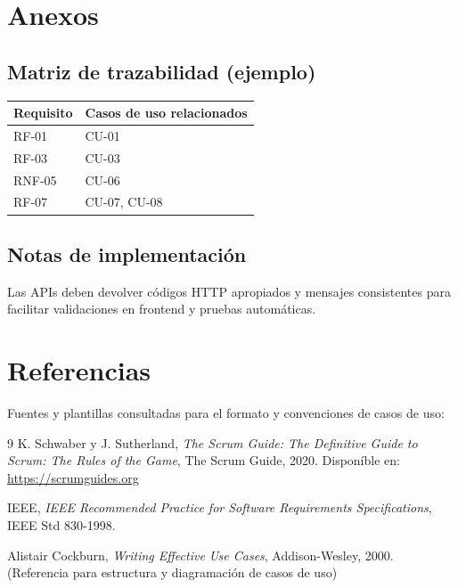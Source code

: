 \documentclass[12pt,a4paper]{article}
\begin{document}
\newpage
\section{Anexos}
\subsection*{Matriz de trazabilidad (ejemplo)}
\begin{tabularx}{\textwidth}{l X}
\toprule
Requisito & Casos de uso relacionados \\
\midrule
RF-01 & CU-01 \\
RF-03 & CU-03 \\
RNF-05 & CU-06 \\
RF-07 & CU-07, CU-08 \\
\bottomrule
\end{tabularx}

\subsection*{Notas de implementaci\'on}
Las APIs deben devolver c\'odigos HTTP apropiados y mensajes consistentes para facilitar validaciones en frontend y pruebas autom\'aticas.

\newpage
\section{Referencias}
Fuentes y plantillas consultadas para el formato y convenciones de casos de uso:
\begin{thebibliography}{9}
K. Schwaber y J. Sutherland,
\textit{The Scrum Guide: The Definitive Guide to Scrum: The Rules of the Game},
The Scrum Guide, 2020. Dispon\'ible en: \url{https://scrumguides.org}

IEEE,
\textit{IEEE Recommended Practice for Software Requirements Specifications},
IEEE Std 830-1998.

Alistair Cockburn,
\textit{Writing Effective Use Cases}, Addison-Wesley, 2000. (Referencia para estructura y diagramaci\'on de casos de uso)
\end{thebibliography}
\end{document}
